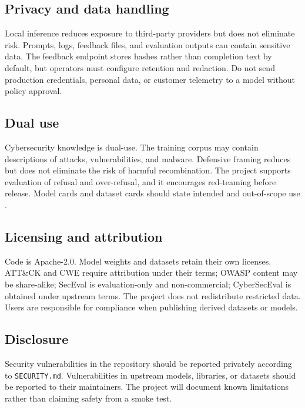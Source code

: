 \subsection{Privacy and data handling}

Local inference reduces exposure to third-party providers but does not eliminate
risk. Prompts, logs, feedback files, and evaluation outputs can contain sensitive
data. The feedback endpoint stores hashes rather than completion text by default,
but operators must configure retention and redaction. Do not send production
credentials, personal data, or customer telemetry to a model without policy
approval.

\subsection{Dual use}

Cybersecurity knowledge is dual-use. The training corpus may contain descriptions
of attacks, vulnerabilities, and malware. Defensive framing reduces but does not
eliminate the risk of harmful recombination. The project supports evaluation of
refusal and over-refusal, and it encourages red-teaming before release. Model
cards and dataset cards should state intended and out-of-scope use
\citep{mitchell2019modelcards}.

\subsection{Licensing and attribution}

Code is Apache-2.0. Model weights and datasets retain their own licenses. ATT\&CK
and CWE require attribution under their terms; OWASP content may be share-alike;
SecEval is evaluation-only and non-commercial; CyberSecEval is obtained under
upstream terms. The project does not redistribute restricted data. Users are
responsible for compliance when publishing derived datasets or models.

\subsection{Disclosure}

Security vulnerabilities in the repository should be reported privately according
to \texttt{SECURITY.md}. Vulnerabilities in upstream models, libraries, or
datasets should be reported to their maintainers. The project will document
known limitations rather than claiming safety from a smoke test.

